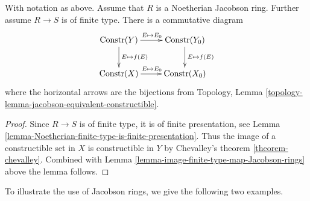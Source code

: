 \begin{lemma}
\label{lemma-conclude-jacobson-Noetherian}
With notation as above. Assume that $R$ is a Noetherian Jacobson ring.
Further assume $R \to S$ is of finite type.
There is a commutative diagram
$$
\xymatrix{
\text{Constr}(Y) \ar[r]^{E \mapsto E_0} \ar[d]^{E \mapsto f(E)} &
\text{Constr}(Y_0) \ar[d]^{E \mapsto f(E)} \cr
\text{Constr}(X) \ar[r]^{E \mapsto E_0} &
\text{Constr}(X_0)
}
$$
where the horizontal arrows are the bijections from
Topology, Lemma \ref{topology-lemma-jacobson-equivalent-constructible}.
\end{lemma}

\begin{proof}
Since $R \to S$ is of finite type, it is of finite presentation,
see Lemma \ref{lemma-Noetherian-finite-type-is-finite-presentation}.
Thus the image of a constructible set in $X$ is constructible
in $Y$ by Chevalley's theorem \ref{theorem-chevalley}. Combined with
Lemma \ref{lemma-image-finite-type-map-Jacobson-rings}
above the lemma follows.
\end{proof}

\noindent
To illustrate the use of Jacobson rings, we give the following two examples.

